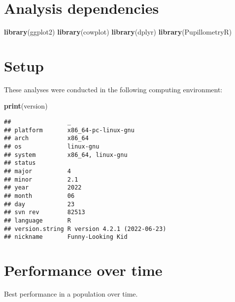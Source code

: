\documentclass[]{book}
\newenvironment{Shaded}{\begin{snugshade}}{\end{snugshade}}
\newcommand{\KeywordTok}[1]{\textcolor[rgb]{0.13,0.29,0.53}{\textbf{#1}}}
\newcommand{\NormalTok}[1]{#1}
\begin{document}
\hypertarget{analysis-dependencies-1}{%
\section{Analysis dependencies}\label{analysis-dependencies-1}}

\begin{Shaded}
\begin{Highlighting}[]
\KeywordTok{library}\NormalTok{(ggplot2)}
\KeywordTok{library}\NormalTok{(cowplot)}
\KeywordTok{library}\NormalTok{(dplyr)}
\KeywordTok{library}\NormalTok{(PupillometryR)}
\end{Highlighting}
\end{Shaded}

\hypertarget{setup-1}{%
\section{Setup}\label{setup-1}}

These analyses were conducted in the following computing environment:

\begin{Shaded}
\begin{Highlighting}[]
\KeywordTok{print}\NormalTok{(version)}
\end{Highlighting}
\end{Shaded}

\begin{verbatim}
##                _                           
## platform       x86_64-pc-linux-gnu         
## arch           x86_64                      
## os             linux-gnu                   
## system         x86_64, linux-gnu           
## status                                     
## major          4                           
## minor          2.1                         
## year           2022                        
## month          06                          
## day            23                          
## svn rev        82513                       
## language       R                           
## version.string R version 4.2.1 (2022-06-23)
## nickname       Funny-Looking Kid
\end{verbatim}

\hypertarget{performance-over-time-1}{%
\section{Performance over time}\label{performance-over-time-1}}

Best performance in a population over time.
\end{document}
